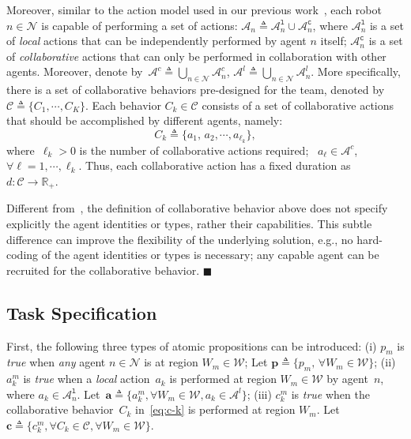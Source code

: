 Moreover, similar to the action model used in our previous work~\citep{guo2016task},
each robot $n\in \mathcal{N}$ is capable of performing a set of actions:
$\mathcal{A}_n\triangleq \mathcal{A}^{\texttt{l}}_n \cup \mathcal{A}^{\texttt{c}}_n$,
where $\mathcal{A}^{\texttt{l}}_n$ is a set of \emph{local} actions that can be independently performed by agent $n$ itself;
$\mathcal{A}^{\texttt{c}}_n$ is a set of \emph{collaborative} actions that can only be performed
in collaboration with other agents.
Moreover, denote by~$\mathcal{A}^c\triangleq\bigcup_{n\in\mathcal{N}}\mathcal{A}^c_n$,
$\mathcal{A}^l\triangleq\bigcup_{n\in\mathcal{N}}\mathcal{A}^l_n$.
More specifically,
there is a set of collaborative behaviors pre-designed for the team,
denoted by~$\mathcal{C}\triangleq \{C_1,\cdots, C_K\}$.
Each behavior $C_k\in \mathcal{C}$ consists of a set of collaborative actions
that should be accomplished by different agents, namely:
\begin{equation}\label{eq:c-k}
C_k\triangleq \{a_1,\,a_2,\cdots,a_{\ell_k}\},
\end{equation}
where~$\ell_k>0$ is the number of collaborative actions required;
~$a_{\ell}\in \mathcal{A}^c$, $\forall \ell=1,\cdots,\ell_k$.
Thus, each collaborative action has a fixed duration as~$d:\mathcal{C}\rightarrow \mathbb{R}_{+}$.



\begin{remark}\label{rm:collaborative}
Different from~\citep{luo2021temporal,sahin2019multirobot, jones2019scratchs},
the definition of collaborative behavior above does not specify explicitly
the agent identities or {types}, rather their capabilities.
This subtle difference can improve the flexibility of the underlying solution,
e.g.,  no hard-coding of the agent identities or types is necessary;
any capable agent can be recruited for the collaborative behavior.
\hfill $\blacksquare$
\end{remark}




\subsection{Task Specification}\label{subsec:task-specification}
First, the following three types of atomic propositions can be introduced:
(i) $p_m$ is \emph{true} when \emph{any} agent $n\in \mathcal{N}$ is at region ${W}_m\in {\mathcal{W}}$;
Let $\mathbf{p}\triangleq \{p_m,\, \forall {W}_m \in {\mathcal{W}}\}$;
(ii) $a^m_k$ is \emph{true} when a \emph{local} action~$a_k$ is performed at region ${W}_m\in{\mathcal{W}}$ by
agent~$n$, where $a_k \in \mathcal{A}_n^{\texttt{l}}$.
Let~$\mathbf{a} \triangleq\{a^m_k,\forall {W}_m \in \mathcal{W}, a_k\in \mathcal{A}^{l}\}$;
(iii) $c^m_k$ is \emph{true} when the collaborative behavior~$C_k$ in~\eqref{eq:c-k} is performed at region $W_m$.
Let $\mathbf{c} \triangleq\{c^m_k,\forall C_k \in \mathcal{C},\forall {W}_m \in {\mathcal{W}}\}$.

